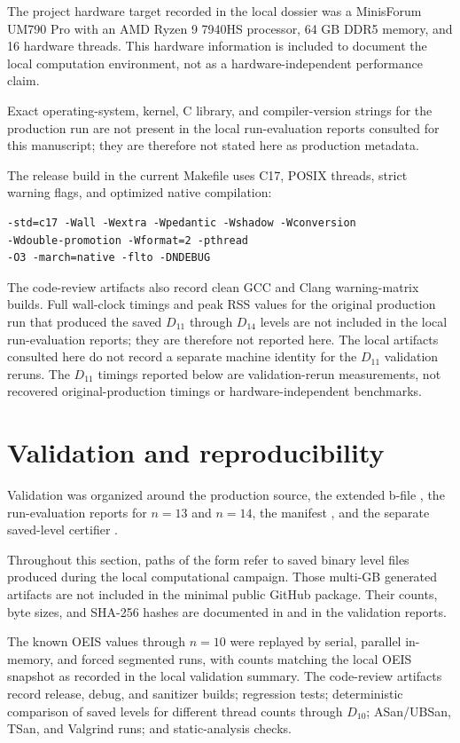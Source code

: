 \documentclass[11pt]{article}
\theoremstyle{definition}
\theoremstyle{remark}
\begin{document}
The project hardware target recorded in the local dossier was a MinisForum
UM790 Pro with an AMD Ryzen 9 7940HS processor, 64 GB DDR5 memory, and 16
hardware threads.  This hardware information is included to document the
local computation environment, not as a hardware-independent performance
claim.

Exact operating-system, kernel, C library, and compiler-version strings for
the production run are not present in the local run-evaluation reports
consulted for this manuscript; they are therefore not stated here as
production metadata.

The release build in the current Makefile uses C17, POSIX threads, strict
warning flags, and optimized native compilation:
\begin{verbatim}
-std=c17 -Wall -Wextra -Wpedantic -Wshadow -Wconversion
-Wdouble-promotion -Wformat=2 -pthread
-O3 -march=native -flto -DNDEBUG
\end{verbatim}
The code-review artifacts also record clean GCC and Clang warning-matrix
builds.  Full wall-clock timings and peak RSS values for the original
production run that produced the saved \(D_{11}\) through \(D_{14}\) levels
are not included in the local run-evaluation reports; they are therefore not
reported here.  The local artifacts consulted here do not record a separate
machine identity for the \(D_{11}\) validation reruns.  The \(D_{11}\)
timings reported below are validation-rerun measurements, not recovered
original-production timings or hardware-independent benchmarks.

\section{Validation and reproducibility}
\label{sec:validation}

Validation was organized around the production source, the extended b-file
, the run-evaluation reports for \(n=13\) and
\(n=14\), the manifest , and the separate
saved-level certifier .

Throughout this section, paths of the form  refer to
saved binary level files produced during the local computational campaign.
Those multi-GB generated artifacts are not included in the minimal public
GitHub package.  Their counts, byte sizes, and SHA-256 hashes are documented
in  and in the validation reports.

The known OEIS values through \(n=10\) were replayed by serial, parallel
in-memory, and forced segmented runs, with counts matching the local OEIS
snapshot as recorded in the local validation summary.  The code-review
artifacts record release, debug, and sanitizer builds; regression tests;
deterministic comparison of saved levels for different thread counts through
\(D_{10}\); ASan/UBSan, TSan, and Valgrind runs; and static-analysis checks.
\end{document}

